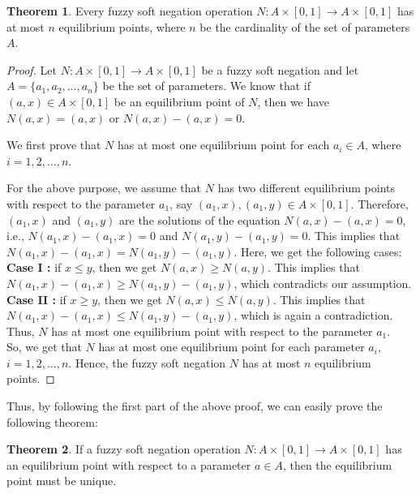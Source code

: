 \documentclass{article}
\theoremstyle{definition}
\newtheorem{theorem}{Theorem}[section]
\begin{document}
\begin{theorem}
    Every fuzzy soft negation operation $N:A\times[0, 1] \to A\times[0, 1]$ has at most $n$ equilibrium points, where $n$ be the cardinality of the set of parameters $A$.
\end{theorem}
\begin{proof}
    Let $N:A\times[0, 1] \to A\times[0, 1]$ be a fuzzy soft negation and let $A=\{a_1, a_2, \dots, a_n\}$ be the set of parameters. We know that if $(a, x)\in A\times [0, 1]$ be an equilibrium point of $N$, then we have $N(a, x)=(a, x)$ or $N(a, x)-(a, x)=0$.

    We first prove that $N$ has at most one equilibrium point for each $a_i \in A$, where $i=1, 2, \dots, n$. 
    
    For the above purpose, we assume that $N$ has two different equilibrium points with respect to the parameter $a_1$, say $(a_1, x), (a_1, y) \in A\times [0, 1]$. Therefore, $(a_1, x)$ and $ (a_1, y)$ are the solutions of the equation $N(a, x)-(a, x)=0$, i.e., $N(a_1, x)-(a_1, x)=0$ and $N(a_1, y)-(a_1, y)=0$. This implies that $N(a_1, x)-(a_1, x)=N(a_1, y)-(a_1, y)$. Here, we get the following cases:\\

    \textbf{Case I :} if $x\leq y$, then we get $N(a, x)\geq N(a, y)$. This implies that $N(a_1, x)-(a_1, x) \geq N(a_1, y)-(a_1, y)$, which contradicts our assumption. \\

    \textbf{Case II :} if $x\geq y$, then we get $N(a, x)\leq N(a, y)$. This implies that $N(a_1, x)-(a_1, x) \leq N(a_1, y)-(a_1, y)$, which is again a contradiction. Thus, $N$ has at most  one equilibrium point with respect to the parameter $a_1$.\\

    So, we get that  $N$ has at most one equilibrium point for each parameter $a_i$, $i=1, 2, \dots, n$. Hence, the fuzzy soft negation $N$ has at most $n$ equilibrium points.
\end{proof}

Thus, by following the first part of the above proof, we can easily prove the following theorem:\\
\begin{theorem}
    If a fuzzy soft negation operation $N:A\times[0, 1] \to A\times[0, 1]$ has an equilibrium point with respect to a parameter $a \in A$, then the equilibrium point must be unique.
\end{theorem}
\end{document}
